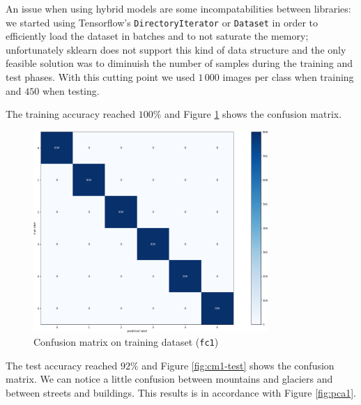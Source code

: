 \documentclass[compsoc]{IEEEtran}
\begin{document}
An issue when using hybrid models are some incompatabilities between libraries: we started using Tensorflow's \texttt{DirectoryIterator} or \texttt{Dataset} in order to efficiently load the dataset in batches and to not saturate the memory; unfortunately sklearn does not support this kind of data structure and the only feasible solution was to diminuish the number of samples during the training and test phases. With this cutting point we used $1\,000$ images per class when training and $450$ when testing. \par
The training accuracy reached $100\%$ and Figure \ref{fig:cm1-train} shows the confusion matrix. 


\begin{figure}[ht!]
\centering                                                                        
\includegraphics[width=3.5in]{../images/cm1-train.png}
\captionsetup{justification=centering}                                                                                         
\caption{Confusion matrix on training dataset (\texttt{fc1})}
\label{fig:cm1-train}                                                                                                                               
\end{figure}

The test accuracy reached $92\%$ and Figure \ref{fig:cm1-test} shows the confusion matrix. We can notice a little confusion between mountains and glaciers and between streets and buildings. This results is in accordance with Figure \ref{fig:pca1}.
\end{document}
